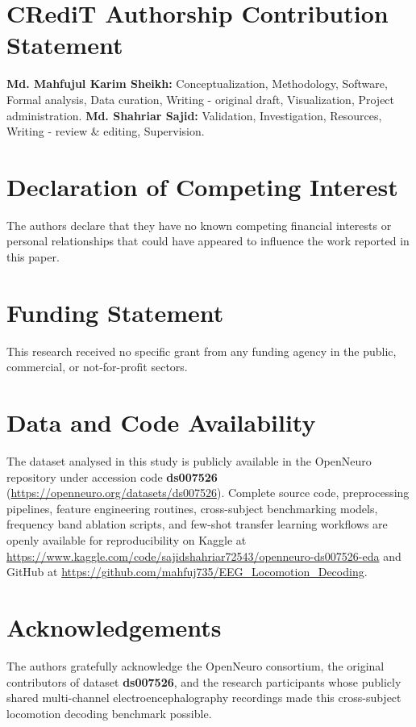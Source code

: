 \documentclass[11pt,a4paper]{article}
\begin{document}

\section*{CRediT Authorship Contribution Statement}
\textbf{Md. Mahfujul Karim Sheikh:} Conceptualization, Methodology, Software, Formal analysis, Data curation, Writing - original draft, Visualization, Project administration. \textbf{Md. Shahriar Sajid:} Validation, Investigation, Resources, Writing - review \& editing, Supervision.

\section*{Declaration of Competing Interest}
The authors declare that they have no known competing financial interests or personal relationships that could have appeared to influence the work reported in this paper.

\section*{Funding Statement}
This research received no specific grant from any funding agency in the public, commercial, or not-for-profit sectors.

\section*{Data and Code Availability}
The dataset analysed in this study is publicly available in the OpenNeuro repository under accession code \textbf{ds007526} (\url{https://openneuro.org/datasets/ds007526}). Complete source code, preprocessing pipelines, feature engineering routines, cross-subject benchmarking models, frequency band ablation scripts, and few-shot transfer learning workflows are openly available for reproducibility on Kaggle at \url{https://www.kaggle.com/code/sajidshahriar72543/openneuro-ds007526-eda} and GitHub at \url{https://github.com/mahfuj735/EEG_Locomotion_Decoding}.


\section*{Acknowledgements}
The authors gratefully acknowledge the OpenNeuro consortium, the original contributors of dataset \textbf{ds007526}, and the research participants whose publicly shared multi-channel electroencephalography recordings made this cross-subject locomotion decoding benchmark possible.
\end{document}
